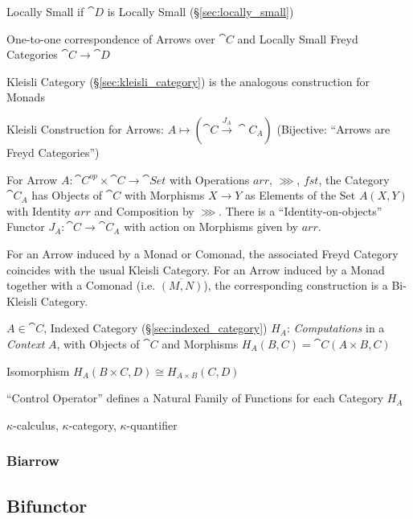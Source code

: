 Locally Small if $\cat{D}$ is Locally Small
(\S\ref{sec:locally_small})

One-to-one correspondence of Arrows over $\cat{C}$ and Locally Small
Freyd Categories $\cat{C} \rightarrow \cat{D}$

Kleisli Category (\S\ref{sec:kleisli_category}) is the analogous
construction for Monads

Kleisli Construction for Arrows: $A \mapsto (\cat{C} \xrightarrow{J_A}
\cat{C}_A)$ (Bijective: ``Arrows are Freyd Categories'')

For Arrow $A : \cat{C}^{op} \times \cat{C} \rightarrow \cat{Set}$ with
Operations $arr$, $\ggg$, $fst$, the Category $\cat{C}_A$ has Objects
of $\cat{C}$ with Morphisms $X \rightarrow Y$ as Elements of the Set
$A(X,Y)$ with Identity $arr$ and Composition by $\ggg$. There is a
``Identity-on-objects'' Functor $J_A : \cat{C} \rightarrow \cat{C}_A$
with action on Morphisms given by $arr$.

For an Arrow induced by a Monad or Comonad, the associated Freyd
Category coincides with the usual Kleisli Category. For an Arrow
induced by a Monad together with a Comonad (i.e. $\overline{(M,N)}$),
the corresponding construction is a Bi-Kleisli Category.
\cite{jacobs-heunen-hasuo09}

$A \in \cat{C}$, Indexed Category (\S\ref{sec:indexed_category})
$H_A$: \emph{Computations} in a \emph{Context} $A$, with Objects of
$\cat{C}$ and Morphisms $H_A(B,C) = \cat{C}(A \times B, C)$

Isomorphism $H_A(B \times C, D) \cong H_{A \times B} (C,D)$

``Control Operator'' defines a Natural Family of Functions for each
Category $H_A$
\cite{paterson01}

$\kappa$-calculus, $\kappa$-category, $\kappa$-quantifier %




\subsubsection{Biarrow}\label{sec:biarrow}



\subsection{Bifunctor}\label{sec:bifunctor}

